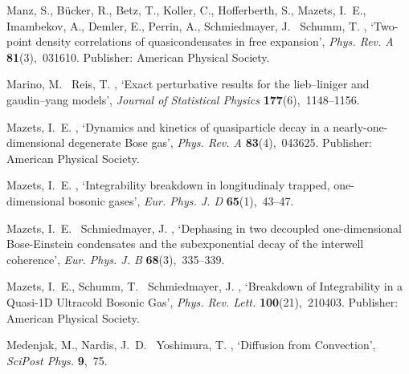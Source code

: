 \documentclass[onecolumn,amsfonts,showpacs,superscriptaddress]{revtex4-1}
\begin{document}
\begin{thebibliography}{xx}
Manz, S., Bücker, R., Betz, T., Koller, C., Hofferberth, S., Mazets, I.~E.,
  Imambekov, A., Demler, E., Perrin, A., Schmiedmayer, J. \harvardand\ Schumm,
  T.  \harvardyearleft 2010\harvardyearright , `Two-point density correlations
  of quasicondensates in free expansion', {\em Phys. Rev. A} {\bf
  81}(3),~031610.
\newblock Publisher: American Physical Society.

Marino, M. \harvardand\ Reis, T.  \harvardyearright ,
  `Exact perturbative results for the lieb--liniger and gaudin--yang models',
  {\em Journal of Statistical Physics} {\bf 177}(6),~1148--1156.

Mazets, I.~E.  \harvardyearright , `Dynamics and
  kinetics of quasiparticle decay in a nearly-one-dimensional degenerate {Bose}
  gas', {\em Phys. Rev. A} {\bf 83}(4),~043625.
\newblock Publisher: American Physical Society.

Mazets, I.~E.  \harvardyearright , `Integrability
  breakdown in longitudinaly trapped, one-dimensional bosonic gases', {\em Eur.
  Phys. J. D} {\bf 65}(1),~43--47.

Mazets, I.~E. \harvardand\ Schmiedmayer, J.  \harvardyearright , `Dephasing in two decoupled one-dimensional
  {Bose}-{Einstein} condensates and the subexponential decay of the interwell
  coherence', {\em Eur. Phys. J. B} {\bf 68}(3),~335--339.

Mazets, I.~E., Schumm, T. \harvardand\ Schmiedmayer, J.  \harvardyearleft
  2008\harvardyearright , `Breakdown of {Integrability} in a {Quasi}-{1D}
  {Ultracold} {Bosonic} {Gas}', {\em Phys. Rev. Lett.} {\bf 100}(21),~210403.
\newblock Publisher: American Physical Society.

Medenjak, M., Nardis, J.~D. \harvardand\ Yoshimura, T.  \harvardyearleft
  2020\harvardyearright , `{Diffusion from Convection}', {\em SciPost Phys.}
  {\bf 9},~75.


\end{thebibliography}
\end{document}
